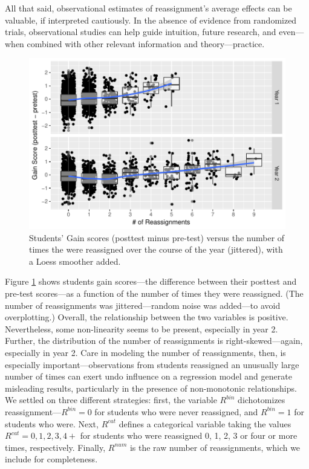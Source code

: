 \documentclass[12pt]{article}\usepackage[]{graphicx}\usepackage[]{color}
\makeatletter
\def\maxwidth{ %
  \ifdim\Gin@nat@width>\linewidth
    \linewidth
  \else
    \Gin@nat@width
  \fi
}
\makeatother
\begin{document}
All that said, observational estimates of reassignment's average
effects can be valuable, if interpreted cautiously.
In the absence of evidence from randomized trials, observational
studies can help guide intuition, future research, and even---when
combined with other relevant information and theory---practice.







\begin{figure}
  \centering

\includegraphics[width=\maxwidth]{figure/cpYyear-1} 

\caption{Students' Gain scores (posttest minus pre-test) versus the number of times the were reassigned over the course of the year (jittered), with a Loess smoother added.}
\label{fig:cpYyear}
\end{figure}

Figure \ref{fig:cpYyear} shows students gain scores---the difference between their posttest and pre-test scores---as a function of the number of times they were reassigned.
(The number of reassignments was jittered---random noise was added---to avoid overplotting.)
Overall, the relationship between the two variables is positive.
Nevertheless, some non-linearity seems to be present, especially in year 2.
Further, the distribution of the number of reassignments is right-skewed---again, especially in year 2.
Care in modeling the number of reassignments, then, is especially important---observations from students reassigned an unusually large number of times can exert undo influence on a regression model and generate misleading results, particularly in the presence of non-monotonic relationships.
We settled on three different strategies: first, the variable $R^{bin}$ dichotomizes reassignment---$R^{bin}=0$ for students who were never reassigned, and $R^{bin}=1$ for students who were.
Next, $R^{cat}$ defines a categorical variable taking the values $R^{cat}=0,1,2,3,4+$ for students who were reassigned 0, 1, 2, 3 or four or more times, respectively.
Finally, $R^{num}$ is the raw number of reassignments, which we include for completeness.
\end{document}
